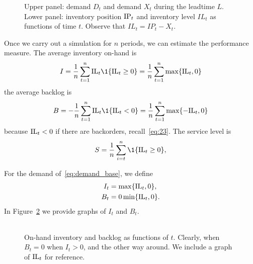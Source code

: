 \begin{figure}[tb]
  \centering
  \begin{tabular}[h]{cc}
\\

  \end{tabular}
  \caption{Upper panel: demand $D_t$ and demand $X_t$ during the leadtime $L$. Lower panel: inventory position $\textrm{IP}_t$ and inventory level $IL_t$ as functions of time $t$. Observe that $IL_t = IP_t - X_t.$}
\label{fig:basestock_demand}
\end{figure}

Once we carry out a simulation for $n$ periods, we can estimate the
performance measure. The average  inventory on-hand is
\begin{equation}
  \label{eq:22}
  I = \frac 1n \sum_{t=1}^n \IL_t\1{\IL_t \geq 0} = \frac1n\sum_{t=1}^n \max\{\IL_t, 0\}
\end{equation}
the average backlog  is
\begin{equation}
  B = - \frac 1n \sum_{t=1}^n \IL_t\1{\IL_t < 0} = \frac1n\sum_{t=1}^n \max\{-\IL_t, 0\}
\end{equation}
because $\textrm{IL}_t<0$ if there are backorders, recall~\eqref{eq:23}. 
The service level is 
\begin{equation}
  \label{eq:22}
  S = \frac 1n \sum_{i=t}^n \1{\IL_t \geq 0},
\end{equation}

For the demand of~\eqref{eq:demand_base}, we define 
\begin{align*}
  I_t &= \max\{\textrm{IL}_t, 0\}, \\
  B_t &= 0 \min\{\textrm{IL}_t, 0\}.
\end{align*}
In Figure~\ref{fig:basestock_on_hand} we provide graphs of $I_t$ and $B_t$.

\begin{figure}[tb]
  \centering
  \begin{tabular}[h]{cc}
\\

  \end{tabular}
  \caption{On-hand inventory and backlog as functions of $t$. Clearly, when $B_t=0$ when $I_t>0$, and the other way around. We include a graph of $\textrm{IL}_t$ for reference.}
\label{fig:basestock_on_hand}
\end{figure}




